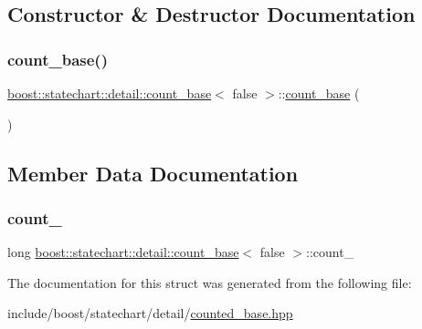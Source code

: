\subsection{Constructor \& Destructor Documentation}
\mbox{\label{structboost_1_1statechart_1_1detail_1_1count__base_3_01false_01_4_a64290a8514a633eed09867b06c2d775b}} 
\subsubsection{\texorpdfstring{count\+\_\+base()}{count\_base()}}
{\footnotesize\ttfamily \mbox{\hyperlink{structboost_1_1statechart_1_1detail_1_1count__base}{boost\+::statechart\+::detail\+::count\+\_\+base}}$<$ false $>$\+::\mbox{\hyperlink{structboost_1_1statechart_1_1detail_1_1count__base}{count\+\_\+base}} (\begin{DoxyParamCaption}{ }\end{DoxyParamCaption})\hspace{0.3cm}{\ttfamily [inline]}}



\subsection{Member Data Documentation}
\mbox{\label{structboost_1_1statechart_1_1detail_1_1count__base_3_01false_01_4_a4adf8ac9f03da5ad5cea93a5ee6d0507}} 
\subsubsection{\texorpdfstring{count\+\_\+}{count\_}}
{\footnotesize\ttfamily long \mbox{\hyperlink{structboost_1_1statechart_1_1detail_1_1count__base}{boost\+::statechart\+::detail\+::count\+\_\+base}}$<$ false $>$\+::count\+\_\+\hspace{0.3cm}{\ttfamily [mutable]}}



The documentation for this struct was generated from the following file\+:\begin{DoxyCompactItemize}
\item 
include/boost/statechart/detail/\mbox{\hyperlink{counted__base_8hpp}{counted\+\_\+base.\+hpp}}\end{DoxyCompactItemize}
